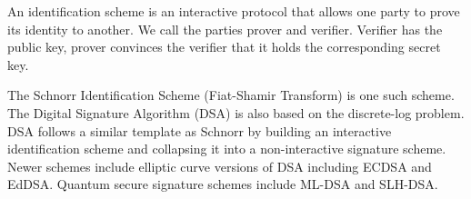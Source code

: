 An identification scheme is an interactive protocol that 
allows one party to prove
its identity to another.
We call the parties prover and verifier.
Verifier has the public key, prover convinces the verifier that it holds the
corresponding secret key.

The Schnorr Identification Scheme (Fiat-Shamir Transform)
is one such scheme. 
The Digital Signature Algorithm (DSA) is also based on the 
discrete-log problem.
DSA follows a similar template as Schnorr by building an 
interactive identification
scheme and collapsing it into a non-interactive signature scheme.
Newer schemes include elliptic curve versions of DSA 
including ECDSA and EdDSA.
Quantum secure signature schemes include ML-DSA and SLH-DSA.
